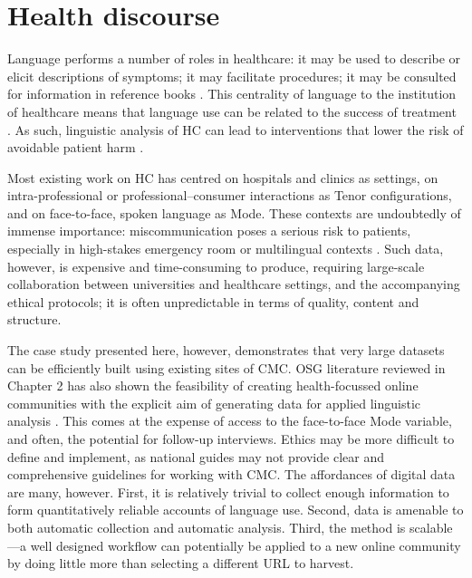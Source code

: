 \section{Health discourse}

Language performs a number of roles in healthcare: it may be used to describe or elicit descriptions of symptoms; it may facilitate procedures; it may be consulted for information in reference books \cite{matthiessen_applying_2013}. This centrality of language to the institution of healthcare means that language use can be related to the success of treatment \cite{divi_language_2007}. As such, linguistic analysis of \gls{HC} can lead to interventions that lower the risk of avoidable patient harm \cite{slade_communicating_2015}.

Most existing work on \gls{HC} has centred on hospitals and clinics as settings, on intra\hyp{}professional or professional--consumer interactions as Tenor configurations, and on face\hyp{}to\hyp{}face, spoken language as \gls{Mode}. These contexts are undoubtedly of immense importance: miscommunication poses a serious risk to patients, especially in high-stakes emergency room or multilingual contexts \cite{slade_role_2015,slade_effective_2015}. Such data, however, is expensive and time-consuming to produce, requiring large-scale collaboration between universities and healthcare settings, and the accompanying ethical protocols; it is often unpredictable in terms of quality, content and structure.

The case study presented here, however, demonstrates that very large datasets can be efficiently built using existing sites of \gls{CMC}. OSG literature reviewed in Chapter 2 has also shown the feasibility of creating health-focussed online communities with the explicit aim of generating data for applied linguistic analysis \cite[e.g.][]{johnson_emergence_2015}. This comes at the expense of access to the face\hyp{}to\hyp{}face \gls{Mode} variable, and often, the potential for follow-up interviews. Ethics may be more difficult to define and implement, as national guides may not provide clear and comprehensive guidelines for working with \gls{CMC}. The affordances of digital data are many, however. First, it is relatively trivial to collect enough information to form quantitatively reliable accounts of language use. Second, data is amenable to both automatic collection and automatic analysis. Third, the method is scalable---a well designed workflow can potentially be applied to a new online community by doing little more than selecting a different URL to harvest.

